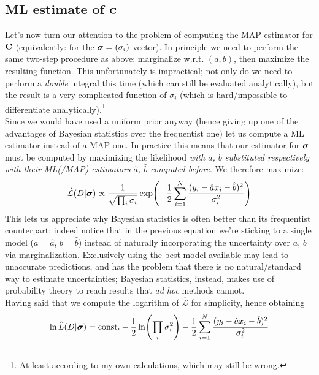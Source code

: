 \documentclass[a4paper]{article}
\newcommand{\mat}[1]{\vb{#1}}
\renewcommand{\L}{\mathcal{L}}%
\begin{document}
\subsection{ML estimate of $\mat{C}$}
Let's now turn our attention to the problem of computing the MAP estimator for $\mat{C}$ (equivalently: for the $\vb*{\sigma} = (\sigma_i)$ vector). In principle we need to perform the same two-step procedure as above: marginalize w.r.t. $(a,b)$, then maximize the resulting function. This unfortunately is impractical; not only do we need to perform a \emph{double} integral this time (which can still be evaluated analytically), but the result is a very complicated function of $\sigma_i$ (which is hard/impossible to differentiate analytically).\footnote{At least according to my own calculations, which may still be wrong.}\\
Since we would have used a uniform prior anyway (hence giving up one of the advantages of Bayesian statistics over the frequentist one) let us compute a ML estimator instead of a MAP one. In practice this means that our estimator for $\vb*{\sigma}$ must be computed by maximizing the likelihood \emph{with $a$, $b$ substituted respectively with their ML(/MAP) estimators $\hat{a}$, $\hat{b}$ computed before}. We therefore maximize:
\begin{equation*}
    \hat{\L}(D|\vb*{\sigma}) \propto \frac{1}{\sqrt{\prod_i \sigma_i}} \exp(-\frac{1}{2}\sum_{i=1}^N \frac{(y_i - \hat{a}x_i - \hat{b})^2}{\sigma_i^2})
\end{equation*}
This lets us appreciate why Bayesian statistics is often better than its frequentist counterpart; indeed notice that in the previous equation we're sticking to a single model ($a = \hat{a}$, $b = \hat{b}$) instead of naturally incorporating the uncertainty over $a$, $b$ via marginalization. Exclusively using the best model available may lead to unaccurate predictions, and has the problem that there is no natural/standard way to estimate uncertainties; Bayesian statistics, instead, makes use of probability theory to reach results that \emph{ad hoc} methods cannot.\\
Having said that we compute the logarithm of $\hat{\L}$ for simplicity, hence obtaining
\begin{equation*}
    \ln\hat{L}(D|\vb*{\sigma}) = \text{const.} - \frac{1}{2}\ln(\prod_i \sigma_i^2) - \frac{1}{2} \sum_{i=1}^N \frac{(y_i - \hat{a}x_i - \hat{b})^2}{\sigma_i^2}
\end{equation*}
\end{document}

